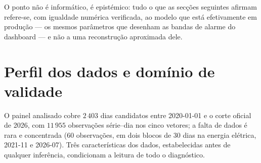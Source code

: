 O ponto não é informático, é epistémico: tudo o que as secções seguintes
afirmam refere-se, com igualdade numérica verificada, ao modelo que está
efetivamente em produção --- os mesmos parâmetros que desenham as bandas de
alarme do dashboard --- e não a uma reconstrução aproximada dele.

\section{Perfil dos dados e domínio de validade}
\label{sec:perfil-dados}


O painel analisado cobre $2\,403$ dias candidatos entre 2020-01-01 e o corte
oficial de 2026, com $11\,955$ observações série--dia nos cinco vetores; a
falta de dados é rara e concentrada (60 observações, em dois blocos de 30 dias
na energia elétrica, 2021-11 e 2026-07). Três características dos dados,
estabelecidas antes de qualquer inferência, condicionam a leitura de todo o
diagnóstico.

